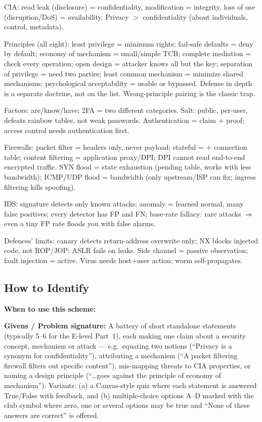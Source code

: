 \documentclass[12pt, a4paper]{article}
\begin{document}
\begin{theorybox}
\begin{tightitem}
    \item CIA: read leak (disclosure) = confidentiality, modification = integrity, loss of use (disruption/DoS) = availability. Privacy $>$ confidentiality (about individuals, control, metadata).
    \item Principles (all eight): least privilege = minimum rights; fail-safe defaults = deny by default; economy of mechanism = small/simple TCB; complete mediation = check every operation; open design = attacker knows all but the key;
    separation of privilege = need two parties; least common mechanism = minimize shared mechanisms; psychological acceptability = usable or bypassed. Defense in depth is a separate doctrine, not on the list. Wrong-principle pairing is the classic trap.
    \item Factors: are/know/have; 2FA = two different categories. Salt: public, per-user, defeats rainbow tables, not weak passwords. Authentication = claim + proof; access control needs authentication first.
    \item Firewalls: packet filter = headers only, never payload; stateful = + connection table; content filtering = application proxy/DPI; DPI cannot read end-to-end encrypted traffic. SYN flood = state exhaustion (pending table, works with less bandwidth); ICMP/UDP flood = bandwidth (only upstream/ISP can fix; ingress filtering kills spoofing).
    \item IDS: signature detects only known attacks; anomaly = learned normal, many false positives; every detector has FP and FN; base-rate fallacy: rare attacks $\Rightarrow$ even a tiny FP rate floods you with false alarms.
    \item Defences' limits: canary detects return-address overwrite only; NX blocks injected code, not ROP/JOP; ASLR fails on leaks. Side channel = passive observation; fault injection = active. Virus needs host+user action; worm self-propagates.
\end{tightitem}
\end{theorybox}

\subsection*{How to Identify}

\textbf{When to use this scheme:}

\textbf{Givens / Problem signature:}
A battery of short standalone statements (typically 5--6 for the E-level Part~1), each making one claim about a security concept, mechanism or attack --- e.g.\ equating two notions (``Privacy is a synonym for confidentiality''), attributing a mechanism (``A packet filtering firewall filters out specific content''), mis-mapping threats to CIA properties, or naming a design principle (``\ldots goes against the principle of economy of mechanism'').
Variants: (a) a Canvas-style quiz where each statement is answered True/False with feedback, and (b) multiple-choice options A--D marked with the club symbol where zero, one or several options may be true and ``None of these answers are correct'' is offered.
\end{document}
